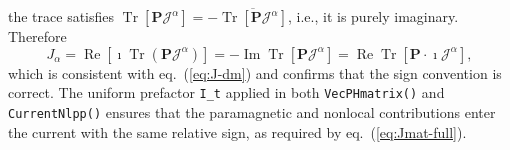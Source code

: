 the trace satisfies
$\operatorname{Tr}[\mathbf{P}\boldsymbol{\mathcal{J}}^\alpha]
= -\overline{\operatorname{Tr}[\mathbf{P}\boldsymbol{\mathcal{J}}^\alpha]}$,
i.e., it is purely imaginary.
Therefore
\begin{equation}
  J_\alpha
  = \operatorname{Re}\!\left[\imath\operatorname{Tr}
    (\mathbf{P}\boldsymbol{\mathcal{J}}^\alpha)\right]
  = -\operatorname{Im}\operatorname{Tr}
    \!\left[\mathbf{P}\boldsymbol{\mathcal{J}}^\alpha\right]
  = \operatorname{Re}\operatorname{Tr}
    \!\left[\mathbf{P}\cdot\imath\boldsymbol{\mathcal{J}}^\alpha\right],
  \label{eq:J-sign-check}
\end{equation}
which is consistent with eq.~(\ref{eq:J-dm}) and confirms that the
sign convention is correct.
The uniform prefactor \texttt{I\_t} applied in both
\texttt{VecPHmatrix()} and \texttt{CurrentNlpp()} ensures that the
paramagnetic and nonlocal contributions enter the current with
the same relative sign, as required by eq.~(\ref{eq:Jmat-full}).



